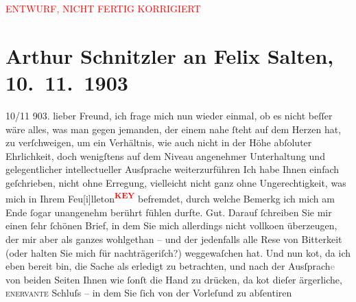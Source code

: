 
\begin{center}
            \textcolor{red}{ENTWURF, NICHT FERTIG KORRIGIERT}
                      \end{center}
            
         
         \renewcommand{\erwaehntePersonen}{Personen: Felix Salten}
         \renewcommand{\erwaehnteOrte}{Orte: Wien}
         \renewcommand{\erwaehnteWerke}{}
               \section[Arthur Schnitzler an Felix Salten, 10. 11. 1903]{ Arthur Schnitzler an Felix Salten, 10. 11. 1903}\nopagebreak{}\rehead{ }\begin{ledgroupsized}[t]{13cm}\normalsize\beginnumbering \toendnotes[C]{\smallbreak\pagebreak[2]} 
\toendnotes[C]{\smallbreak}\pstart
           \raggedleft{}{\pb}10/11 903.\pend
           \pstart
           lieber Freund, ich frage mich nun wieder einmal, ob es nicht beſſer
               wäre alles, was man gegen jemanden, der einem nahe ſteht auf dem Herzen hat, zu
               verſchweigen, um ein Verhältnis, wie auch nicht in der Höhe abſoluter Ehrlichkeit,
               doch wenigſtens auf dem Niveau angenehmer Unterhaltung {\pb}und gelegentlicher intellectueller
               Ausſprache weiterzurführen{\dotstwo} Ich habe Ihnen einfach geſchrieben, nicht ohne Erregung, vielleicht nicht ganz ohne
               Ungerechtigkeit, was mich in Ihrem Feu{[}i{]}lleton\textcolor{red}{\textsuperscript{\textbf{KEY}}} befremdet, durch welche Bemerkg ich mich
               am Ende ſogar unangenehm berührt fühlen durfte. Gut. Darauf ſchreiben Sie mir einen
               ſehr {\pb}ſchönen Brief, in dem Sie
               mich allerdings nicht vollko{\geminationm}en überzeugen, der mir aber
               als ganzes wohlgethan – und der jedenfalls alle Rese von Bitterkeit (oder halten Sie
               mich für nachträgeriſch?) weggewaſchen hat. Und nun ko{\geminationm}t, da ich eben bereit bin, die Sache als erledigt zu betrachten, und nach der
                  Ausſprach\textcolor{gray}{e} von beiden Seiten {\pb}Ihnen wie ſonſt die Hand zu
               drücken, da ko{\geminationm}t dieſer ärgerliche, \textsc{enervante} Schluſs – in dem Sie ſich von der Vorleſund zu abſentiren

\end{ledgroupsized}
